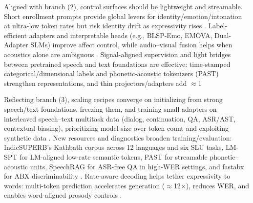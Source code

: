 \documentclass{article}
\begin{document}
Aligned with branch (2), control surfaces should be lightweight and streamable. Short enrollment prompts provide global levers for identity/emotion/intonation at ultra-low token rates but risk identity drift as expressivity rises \cite{wang2024evaluatingtextspeechsynthesislargediscre}. Label-efficient adapters and interpretable heads (e.g., BLSP-Emo, EMOVA, Dual-Adapter SLMs) improve affect control, while audio--visual fusion helps when acoustics alone are ambiguous \cite{wang2024blspemotowardsempatheticlargespeechlangu,chen2025emovaempoweringlanguagemodelsseehearspea,wang2025dualinformationspeechlanguagemodelsemoti}. Signal-aligned supervision and light bridges between pretrained speech and text foundations are effective: time-stamped categorical/dimensional labels and phonetic-acoustic tokenizers (PAST) strengthen representations, and thin projectors/adapters add $\approx$1%

Reflecting branch (3), scaling recipes converge on initializing from strong speech/text foundations, freezing them, and training small adapters on interleaved speech--text multitask data (dialog, continuation, QA, ASR/AST, contextual biasing), prioritizing model size over token count and exploiting synthetic data \cite{maimon2025scalinganalysisinterleavedspeechtextlang,wang2023slmbridgethingapbetweenspeechtextfoundat}. New resources and diagnostics broaden training/evaluation: IndicSUPERB's Kathbath corpus across 12 languages and six SLU tasks, LM-SPT for LM-aligned low-rate semantic tokens, PAST for streamable phonetic--acoustic units, SpeechRAG for ASR-free QA in high-WER settings, and fastabx for ABX discriminability \cite{entry2025indicsuperbspeechprocessinguniversalperf,jo2025lmsptalignedsemanticdistillationspeechto,har-tuv2025pastphoneticacousticspeechtokenizer,min2025speechretrievalaugmentedgenerationwithou,poli2025fastabxlibraryefficientcomputationabxdis}. Rate-aware decoding helps tether expressivity to words: multi-token prediction accelerates generation ($\approx$12$\times$), reduces WER, and enables word-aligned prosody controls \cite{qian2025prosodylmuncoveringemergingprosodyproces,fan2025whatmakesgoodspeechtokenizerllmcentricge}.
\end{document}
